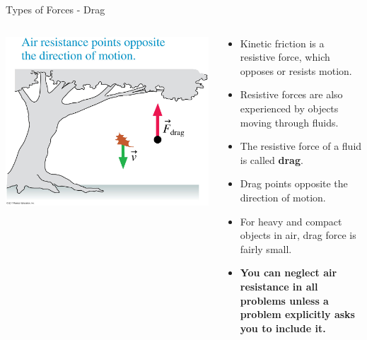 \documentclass{beamer}
\begin{document}
 \begin{frame}{Types of Forces - Drag}
\begin{columns}
\begin{column}{0.4\textwidth}
\begin{center}
   \includegraphics[width=\textwidth]{../figures/05_09_Figure.jpg}
\end{center}
\end{column}
\begin{column}{0.6\textwidth}
\begin{itemize}
   \item Kinetic friction is a resistive force, which opposes or resists motion.
   \item Resistive forces are also experienced by objects moving through fluids.
   \item The resistive force of a fluid is called {\bf drag}.
   \item Drag points opposite the direction of motion.
   \item For heavy and compact objects in air, drag force is fairly small.
   \item {\bf You can neglect air resistance in all problems unless a problem explicitly asks you to include it.}
\end{itemize}
\end{column}
\end{columns}
\end{frame}
\end{document}
